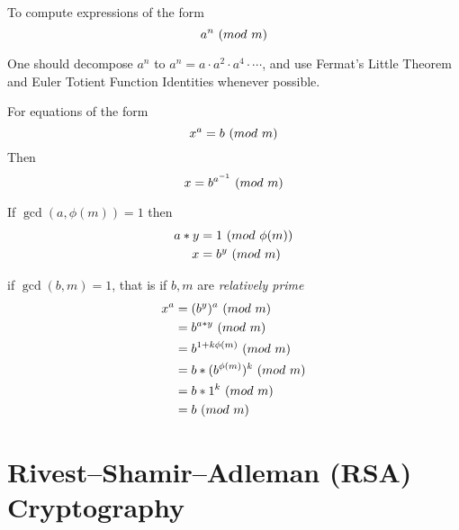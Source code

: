 \begin{remark}
    To compute expressions of the form
    \begin{equation}
        a^n \ (\relax{mod}\ m)
    \end{equation}
    
    One should decompose $a^n$ to $a^n = a \cdot a^2 \cdot a^4 \cdot \cdots$, and use Fermat's Little Theorem and Euler Totient Function Identities whenever possible.
\end{remark}

\begin{remark}
    For equations of the form
    \begin{equation}
        x^a = b \ (\relax{mod}\ m)
    \end{equation}
    Then
    \begin{equation}
        x = b^{{a}^{-1}} \ (\relax{mod}\ m)
    \end{equation}
    
    If $\gcd(a, \phi(m)) = 1$ then
    \begin{align}
        a \ast y &= 1 \ (\relax{mod}\ \phi(m)) \\
        x        &= b^y \ (\relax{mod}\ m)
    \end{align}
    
    if $\gcd(b, m) = 1$, that is if $b, m$ are \textit{relatively prime}
    \begin{align}
        x^a &= (b^y)^a \ (\relax{mod}\ m) \\
            &= b^{a \ast y} \ (\relax{mod}\ m) \\
            &= b^{1 + k \phi(m)} \ (\relax{mod}\ m) \\
            &= b \ast (b^{\phi(m)})^k \ (\relax{mod}\ m) \\
            &= b \ast 1^k \ (\relax{mod}\ m) \\
            &= b \ (\relax{mod}\ m)
    \end{align}
\end{remark}


\section{Rivest–Shamir–Adleman (RSA) Cryptography}

